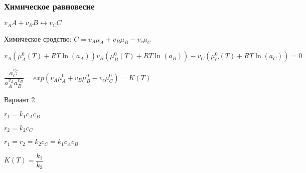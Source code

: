 \begin{frame}
	\frametitle{Химическое равновесие}
	$v_A A +v_B B \leftrightarrow v_C C$
	
	Химическое сродство:
	$C=v_A \mu_A +v_B \mu_B -v_c \mu_C $
	
	$v_A (\mu^0_A(T) +RT \ln(a_A)) v_B (\mu^0_B(T) + RT \ln(a_B)) -v_C (\mu^0_C(T) +RT \ln(a_C))  =0$
	
	$\dfrac { a_C^{v_C} } { a_A^{v_A} a_B^{v_B} } = exp( v_A \mu_A^0 +v_B \mu_B^0 -v_c \mu_C^0 )=K( T )$
	
	Вариант 2
	
	$r_1=k_1 c_A c_B$
	
	$r_2=k_2 c_C$
	
	$r_1=r_2=k_2 c_C=k_1 c_A c_B$
	
	$K( T )=\dfrac {k_1} {k_2}$
\end{frame}
